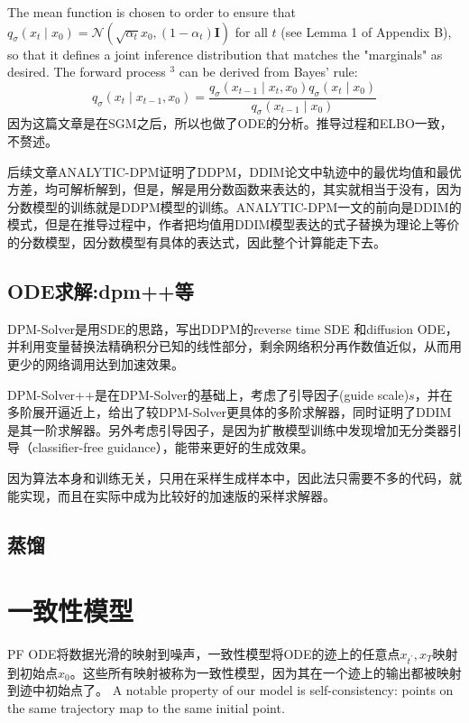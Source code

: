 The mean function is chosen to order to ensure that $q_\sigma\left(x_t \mid x_0\right)=\mathcal{N}\left(\sqrt{\alpha_t} x_0,\left(1-\alpha_t\right) \boldsymbol{I}\right)$ for all $t$ (see Lemma 1 of Appendix B), so that it defines a joint 
inference distribution that matches the "marginals" as desired. The forward process ${ }^3$ can be derived from Bayes' rule:
$$
q_\sigma\left(x_t \mid x_{t-1}, x_0\right)=\frac{q_\sigma\left(x_{t-1} \mid x_t, x_0\right) q_\sigma\left(x_t \mid x_0\right)}{q_\sigma\left(x_{t-1} \mid x_0\right)}
$$
因为这篇文章是在SGM之后，所以也做了ODE的分析。推导过程和ELBO一致，不赘述。

后续文章ANALYTIC-DPM证明了DDPM，DDIM论文中轨迹中的最优均值和最优方差，均可解析解到，但是，解是用分数函数来表达的，其实就相当于没有，因为分数模型的训练就是DDPM模型的训练。ANALYTIC-DPM一文的前向是DDIM的模式，但是在推导过程中，作者把均值用DDIM模型表达的式子替换为理论上等价的分数模型，因分数模型有具体的表达式，因此整个计算能走下去。




\subsection{ODE求解:dpm++等}
DPM-Solver是用SDE的思路，写出DDPM的reverse time SDE 和diffusion  ODE，并利用变量替换法精确积分已知的线性部分，剩余网络积分再作数值近似，从而用更少的网络调用达到加速效果。

DPM-Solver++是在DPM-Solver的基础上，考虑了引导因子(guide scale)$s$，并在多阶展开逼近上，给出了较DPM-Solver更具体的多阶求解器，同时证明了DDIM是其一阶求解器。另外考虑引导因子，是因为扩散模型训练中发现增加无分类器引导（classifier-free guidance），能带来更好的生成效果。

因为算法本身和训练无关，只用在采样生成样本中，因此法只需要不多的代码，就能实现，而且在实际中成为比较好的加速版的采样求解器。



\subsection{蒸馏}





\section{一致性模型}
PF ODE将数据光滑的映射到噪声，一致性模型将ODE的迹上的任意点$x_{t^{\prime}}, x_T$映射到初始点$x_0$。这些所有映射被称为一致性模型，因为其在一个迹上的输出都被映射到迹中初始点了。 A notable property of our model is self-consistency: points on the same trajectory map to the same initial point.

